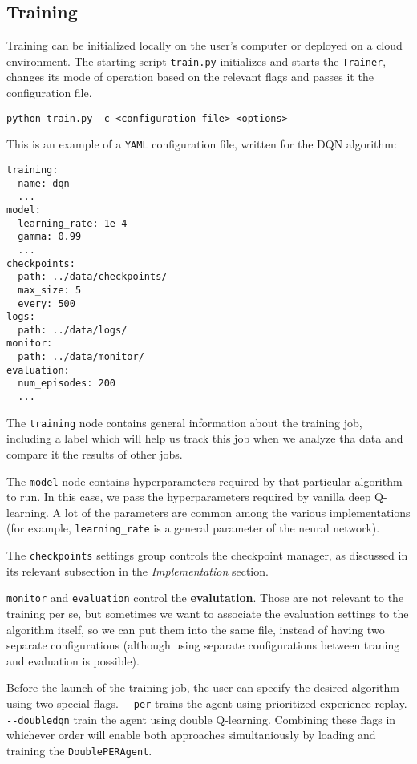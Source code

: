 \subsection*{Training}
Training can be initialized locally on the user's computer or deployed on a cloud environment.
The starting script \verb|train.py| initializes and starts the \verb|Trainer|, changes its mode of operation based on the relevant flags and passes it the configuration file.
\begin{verbatim}
python train.py -c <configuration-file> <options>
\end{verbatim}

This is an example of a \verb|YAML| configuration file, written for the DQN algorithm:
\begin{verbatim}
training:
  name: dqn
  ...
model:
  learning_rate: 1e-4
  gamma: 0.99
  ...
checkpoints:
  path: ../data/checkpoints/
  max_size: 5
  every: 500
logs:
  path: ../data/logs/
monitor:
  path: ../data/monitor/
evaluation:
  num_episodes: 200
  ...
\end{verbatim}

The \verb|training| node contains general information about the training job, including a label which will help us track this job when we analyze tha data and compare it the results of other jobs.

The \verb|model| node contains hyperparameters required by that particular algorithm to run. In this case, we pass the hyperparameters required by vanilla deep Q-learning.
A lot of the parameters are common among the various implementations (for example, \verb|learning_rate| is a general parameter of the neural network).

The \verb|checkpoints| settings group controls the checkpoint manager, as discussed in its relevant subsection in the \emph{Implementation} section.

\verb|monitor| and \verb|evaluation| control the \textbf{evalutation}. Those are not relevant to the training per se, but sometimes we want to associate the evaluation settings to the algorithm itself, so we can put them into the same file, instead of having two separate configurations (although using separate configurations between traning and evaluation is possible).

Before the launch of the training job, the user can specify the desired algorithm using two special flags.
\verb|--per| trains the agent using prioritized experience replay.
\verb|--doubledqn| train the agent using double Q-learning.
Combining these flags in whichever order will enable both approaches simultaniously by loading and training the \verb|DoublePERAgent|.

